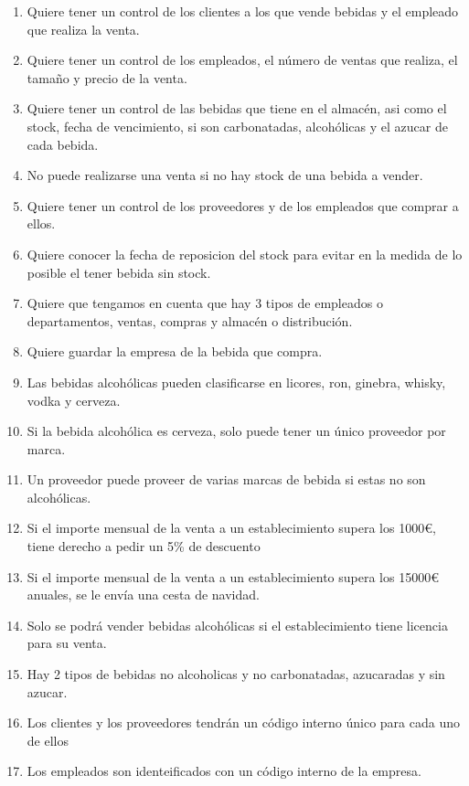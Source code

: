 \documentclass{article}
\begin{document}
\begin{enumerate}
        \item Quiere tener un control de los clientes a los que vende bebidas y el empleado que realiza la venta.
        \item Quiere tener un control de los empleados, el número de ventas que realiza, el tamaño y precio de la venta.
        \item Quiere tener un control de las bebidas que tiene en el almacén, asi como el stock, fecha de vencimiento, si son carbonatadas, alcohólicas y el azucar de cada bebida.
        \item No puede realizarse una venta si no hay stock de una bebida a vender.
        \item Quiere tener un control de los proveedores y de los empleados que comprar a ellos.
        \item Quiere conocer la fecha de reposicion del stock para evitar en la medida de lo posible el tener bebida sin stock.
        \item Quiere que tengamos en cuenta que hay 3 tipos de empleados o departamentos, ventas, compras y almacén o distribución.
        \item Quiere guardar la empresa de la bebida que compra.
        \item Las bebidas alcohólicas pueden clasificarse en licores, ron, ginebra, whisky, vodka y cerveza.
        \item Si la bebida alcohólica es cerveza, solo puede tener un único proveedor por marca.
        \item Un proveedor puede proveer de varias marcas de bebida si estas no son alcohólicas.
        \item Si el importe mensual de la venta a un establecimiento supera los 1000€, tiene derecho a pedir un 5\% de descuento
        \item Si el importe mensual de la venta a un establecimiento supera los 15000€ anuales, se le envía una cesta de navidad.
        \item Solo se podrá vender bebidas alcohólicas si el establecimiento tiene licencia para su venta.
        \item Hay 2 tipos de bebidas no alcoholicas y no carbonatadas, azucaradas y sin azucar.
        \item Los clientes y los proveedores tendrán un código interno único para cada uno de ellos
        \item Los empleados son identeificados con un código interno de la empresa.

      \end{enumerate}
\end{document}
